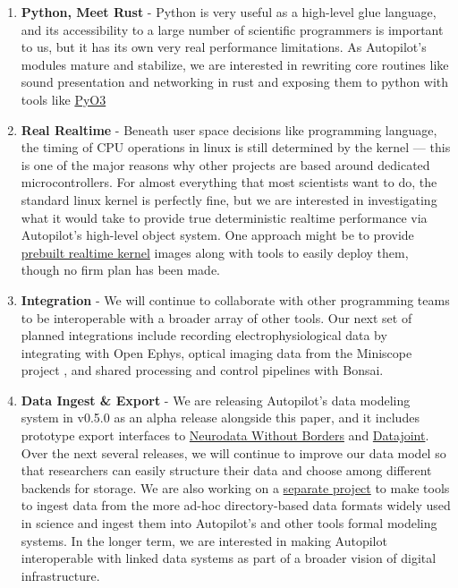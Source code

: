 \begin{enumerate}[ref=\thechapter.\arabic*]
    \item \label{future:rust}\textbf{Python, Meet Rust} - Python is very useful as a high-level glue language, and its accessibility to a large number of scientific programmers is important to us, but it has its own very real performance limitations. As Autopilot's modules mature and stabilize, we are interested in rewriting core routines like sound presentation and networking in rust and exposing them to python with tools like \href{https://github.com/PyO3/pyo3}{PyO3}
    \item \label{future:realtime}\textbf{Real Realtime} - Beneath user space decisions like programming language, the timing of CPU operations in linux is still determined by the kernel --- this is one of the major reasons why other projects are based around dedicated microcontrollers. For almost everything that most scientists want to do, the standard linux kernel is perfectly fine, but we are interested in investigating what it would take to provide true deterministic realtime performance via Autopilot's high-level object system. One approach might be to provide \href{https://github.com/ros-realtime/linux-real-time-kernel-builder}{prebuilt realtime kernel} images along with tools to easily deploy them, though no firm plan has been made.
    \item \label{item:othertools} \textbf{Integration} - We will continue to collaborate with other programming teams to be interoperable with a broader array of other tools. Our next set of planned integrations include recording electrophysiological data by integrating with Open Ephys\citep{siegleOpenEphysOpensource2017}, optical imaging data from the Miniscope project \citep{aharoniCircuitInvestigationsOpenSource2019,aharoniAllLightThat2019}, and shared processing and control pipelines with Bonsai\citep{lopesBonsaiEventbasedFramework2015b}.
    \item \label{future:data}\textbf{Data Ingest \& Export} - We are releasing Autopilot's data modeling system in v0.5.0 as an alpha release alongside this paper, and it includes prototype export interfaces to \href{https://www.nwb.org/}{Neurodata Without Borders}\citep{rubelNWBAccessibleData2019} and \href{https://www.datajoint.com/}{Datajoint}\citep{yatsenkoDataJointSimplerRelational2018a}. Over the next several releases, we will continue to improve our data model so that researchers can easily structure their data and choose among different backends for storage. We are also working on a \href{https://github.com/auto-pi-lot/ingesture}{separate project} to make tools to ingest data from the more ad-hoc directory-based data formats widely used in science and ingest them into Autopilot's and other tools formal modeling systems. In the longer term, we are interested in making Autopilot interoperable with linked data systems as part of a broader vision of digital infrastructure.

\end{enumerate}
